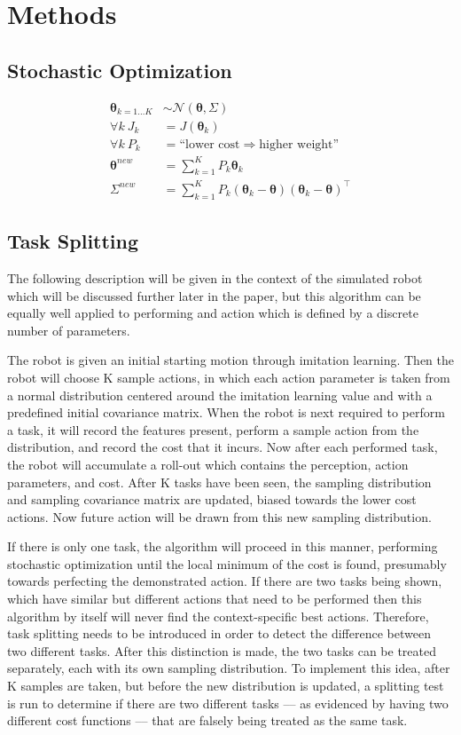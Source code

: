 \documentclass[12pt]{article}
\newcommand{\act}{\bm{\theta}}
\begin{document}
\section{Methods}
\subsection{Stochastic Optimization}

\begin{align*}
\act_{k=1\dots K} & {\sim}\mathcal{N}({\act},{\Sigma})\\
\forall k~J_k & = J(\act_k)\\
\forall k~P_k & = \mbox{``lower cost} \Rightarrow \mbox{higher weight''}\\
\act^{new} & = \sum_{k=1}^{K} P_k \act_k\\
\Sigma^{new} & = \sum_{k=1}^{K}P_k(\act_k-\act)(\act_k-\act)^\intercal
\end{align*}


\subsection{Task Splitting}
The following description will be given in the context of the simulated robot which will be discussed further later in the paper, but this algorithm can be equally well applied to performing and action which is defined by a discrete number of parameters. 

The robot is given an initial starting motion through imitation learning. Then the robot will choose K sample actions, in which each action parameter is taken from a normal distribution centered around the imitation learning value and with a predefined initial covariance matrix. When the robot is next required to perform a task, it will record the features present, perform a sample action from the distribution, and record the cost that it incurs. Now after each performed task, the robot will accumulate a roll-out which contains the perception, action parameters, and cost. After K tasks have been seen, the sampling distribution and sampling covariance matrix are updated, biased towards the lower cost actions. Now future action will be drawn from this new sampling distribution. 

If there is only one task, the algorithm will proceed in this manner, performing stochastic optimization until the local minimum of the cost is found, presumably towards perfecting the demonstrated action. If there are two tasks being shown, which have similar but different actions that need to be performed then this algorithm by itself will never find the context-specific best actions. Therefore, task splitting needs to be introduced in order to detect the difference between two different tasks. After this distinction is made, the two tasks can be treated separately, each with its own sampling distribution. To implement this idea, after K samples are taken, but before the new distribution is updated, a splitting test is run to determine if there are two different tasks –-- as evidenced by having two different cost functions –-- that are falsely being treated as the same task.
\end{document}
